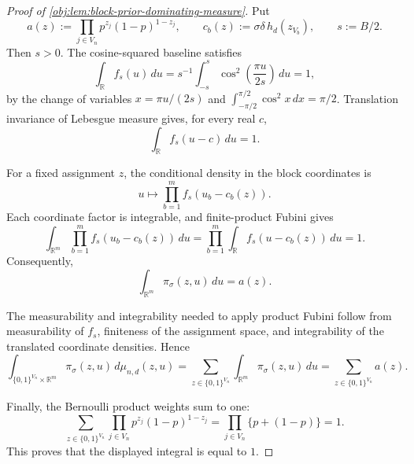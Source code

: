 \begin{proof}[Proof of \cref{obj:lem:block-prior-dominating-measure}]
Put
\[
a(z):=\prod_{j\in V_n}p^{z_j}(1-p)^{1-z_j},
\qquad
c_b(z):=\sigma\delta\,h_d(z_{V_b}),
\qquad
s:=B/2 .
\]
Then \(s>0\).  The cosine-squared baseline satisfies
\[
\int_{\mathbb R} f_s(u)\,du
=
s^{-1}\int_{-s}^{s}\cos^2\!\left(\frac{\pi u}{2s}\right)\,du
=1,
\]
by the change of variables \(x=\pi u/(2s)\) and
\(\int_{-\pi/2}^{\pi/2}\cos^2 x\,dx=\pi/2\).  Translation invariance of Lebesgue measure gives, for every real \(c\),
\[
\int_{\mathbb R} f_s(u-c)\,du=1 .
\]

For a fixed assignment \(z\), the conditional density in the block coordinates is
\[
u\longmapsto \prod_{b=1}^{m} f_s(u_b-c_b(z)).
\]
Each coordinate factor is integrable, and finite-product Fubini gives
\[
\int_{\mathbb R^m}\prod_{b=1}^{m} f_s(u_b-c_b(z))\,du
=
\prod_{b=1}^{m}\int_{\mathbb R}f_s(u-c_b(z))\,du
=
1 .
\]
Consequently,
\[
\int_{\mathbb R^m}\pi_\sigma(z,u)\,du
=
a(z).
\]

The measurability and integrability needed to apply product Fubini follow from measurability of \(f_s\), finiteness of the assignment space, and integrability of the translated coordinate densities.  Hence
\[
\int_{\{0,1\}^{V_n}\times\mathbb R^m}
\pi_\sigma(z,u)\,d\mu_{n,d}(z,u)
=
\sum_{z\in\{0,1\}^{V_n}}
\int_{\mathbb R^m}\pi_\sigma(z,u)\,du
=
\sum_{z\in\{0,1\}^{V_n}} a(z).
\]

Finally, the Bernoulli product weights sum to one:
\[
\sum_{z\in\{0,1\}^{V_n}}
\prod_{j\in V_n}p^{z_j}(1-p)^{1-z_j}
=
\prod_{j\in V_n}\{p+(1-p)\}
=
1 .
\]
This proves that the displayed integral is equal to \(1\). %
\end{proof}
